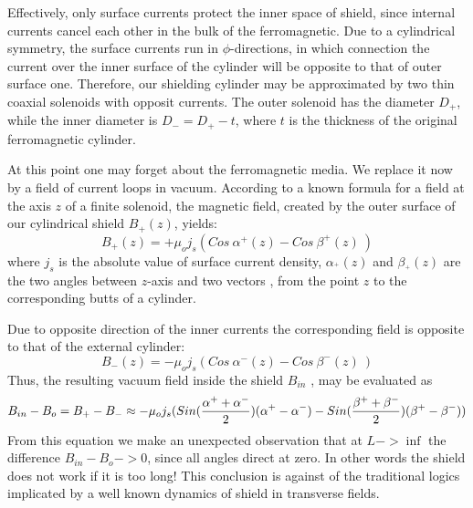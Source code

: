 \documentclass[12pt]{article}
\begin{document}
   Effectively, only surface currents protect the inner space of shield, since internal  currents cancel each other in the bulk
of the ferromagnetic.
Due to a cylindrical symmetry,  the surface  currents  run in $\phi$-directions,
in which connection the current over the inner surface of the cylinder
will be opposite to that of outer surface one. Therefore, our shielding cylinder  may
be approximated by two  thin coaxial solenoids with opposit currents.
The outer solenoid has the diameter $D_+$, while the inner diameter is
$D_-=D_+-t$, where $t$ is the thickness of the original ferromagnetic cylinder.

  At this  point one may forget about the ferromagnetic 
media.  We  replace it now by a field of current loops  in vacuum.
According  to a  known formula for a
field at the axis $z$  of a  finite  solenoid,
the magnetic field, created by the outer
surface of our cylindrical shield  $B_+(z)$,  yields:
%
\begin{equation}
 B_{+}(z)=+\mu_o j_s(Cos~\alpha^+(z)-Cos~\beta^+(z)~)
\label{eq31}
\end{equation}
%
where $j_s$ is the absolute value of surface current density,
 $\alpha_^+(z)$ and $\beta_^+(z)$
are  the two  angles between  $z$-axis and two  vectors ,
from  the  point $z$ to the corresponding butts  of  a  cylinder.

Due to  opposite direction of  the inner 
currents the corresponding field is opposite to that of the  external cylinder:
%
\begin{equation}
B_-(z)=-\mu_o j_s(Cos~\alpha^-(z) - Cos~\beta^-(z)~)
\label{eq32}
\end{equation}
%
Thus, the resulting vacuum field inside the   shield $B_{in}$ , may  be evaluated as
%
\begin{equation}
B_{in}-B_o = B_+ - B_-
\approx - \mu_o j_s
\small{(Sin(\frac{\alpha^++\alpha^-}{2})(\alpha^+-\alpha^-)
-Sin(\frac{\beta^++\beta^-}{2})(\beta^+-\beta^-))}
\label{eq1}
\end{equation}
%
From this equation we make an unexpected  observation
that at $L->\inf$  the difference  $B_{in}-B_o->0$, since all angles direct at zero.
In other words the shield  does  not work if it is too  long!
This conclusion is against of  the traditional logics implicated by a well known 
dynamics of shield in  transverse fields. 
\end{document}
